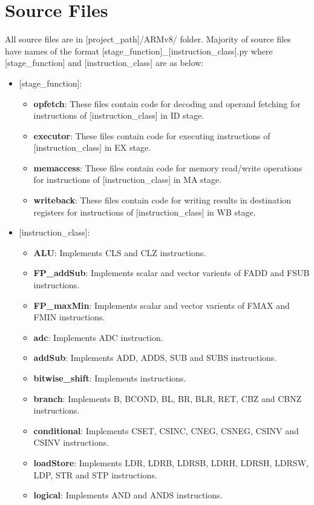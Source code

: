 \documentclass[12pt]{report}
\begin{document}
\section*{Source Files}
All source files are in [project\_path]/ARMv8/ folder. Majority of source files have names of the format [stage\_function]\_[instruction\_class].py where [stage\_function] and [instruction\_class] are as below:
\begin{itemize}
\item{[stage\_function]:}
\begin{itemize}
\item{\textbf{opfetch}: These files contain code for decoding and operand fetching for instructions of [instruction\_class] in ID stage.}
\item{\textbf{executor}: These files contain code for executing instructions of [instruction\_class] in EX stage.}
\item{\textbf{memaccess}: These files contain code for memory read/write operations for instructions of [instruction\_class] in MA stage.}
\item{\textbf{writeback}: These files contain code for writing results in destination registers for instructions of [instruction\_class] in WB stage.}
\end{itemize}
\item{[instruction\_class]:}
\begin{itemize}
\item{\textbf{ALU}: Implements CLS and CLZ instructions.}
\item{\textbf{FP\_addSub}: Implements scalar and vector varients of FADD and FSUB instructions.}
\item{\textbf{FP\_maxMin}: Implements scalar and vector varients of FMAX and FMIN instructions.}
\item{\textbf{adc}: Implements ADC instruction.}
\item{\textbf{addSub}: Implements ADD, ADDS, SUB and SUBS instructions.}
\item{\textbf{bitwise\_shift}: Implements  instructions.}
\item{\textbf{branch}: Implements B, BCOND, BL, BR, BLR, RET, CBZ and CBNZ instructions.}
\item{\textbf{conditional}: Implements CSET, CSINC, CNEG, CSNEG, CSINV and CSINV instructions.}
\item{\textbf{loadStore}: Implements LDR, LDRB, LDRSB, LDRH, LDRSH, LDRSW, LDP, STR and STP instructions.}
\item{\textbf{logical}: Implements AND and ANDS instructions.}

\end{itemize}
\end{itemize}
\end{document}
